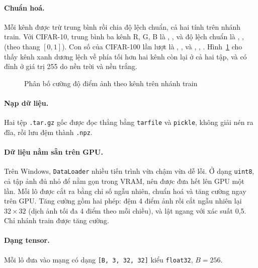 \paragraph{Chuẩn hoá.} Mỗi kênh được trừ trung bình rồi chia độ lệch chuẩn, cả hai tính trên nhánh train. Với CIFAR-10,
trung bình ba kênh R, G, B là , ,  và độ lệch chuẩn
là , ,  (theo thang $[0,1]$). Con số của CIFAR-100 lần lượt
là , ,  và ,
, . Hình~\ref{fig:histpixel} cho thấy kênh xanh dương lệch về phía tối
hơn hai kênh còn lại ở cả hai tập, và có đỉnh ở giá trị 255 do nền trời và nền trắng.

\begin{figure}[H]
  \centering
  \caption{Phân bố cường độ điểm ảnh theo kênh trên nhánh train}
  \label{fig:histpixel}
\end{figure}

\paragraph{Nạp dữ liệu.} Hai tệp \texttt{.tar.gz} gốc được đọc thẳng bằng \texttt{tarfile} và \texttt{pickle},
không giải nén ra đĩa, rồi lưu đệm thành \texttt{.npz}.


\paragraph{Dữ liệu nằm sẵn trên GPU.} Trên Windows, \texttt{DataLoader} nhiều tiến trình vừa chậm vừa dễ lỗi. Ở dạng
\texttt{uint8}, cả tập ảnh đủ nhỏ để nằm gọn trong VRAM, nên được đưa hết lên GPU một lần. Mỗi lô được cắt ra bằng chỉ số
ngẫu nhiên, chuẩn hoá và tăng cường ngay trên GPU. Tăng cường gồm hai phép: đệm 4 điểm ảnh rồi cắt ngẫu nhiên lại
$32\times32$ (dịch ảnh tối đa 4 điểm theo mỗi chiều), và lật ngang với xác suất 0,5. Chỉ nhánh train được tăng cường.


\paragraph{Dạng tensor.} Mỗi lô đưa vào mạng có dạng \texttt{[B, 3, 32, 32]} kiểu \texttt{float32}, $B=256$.

